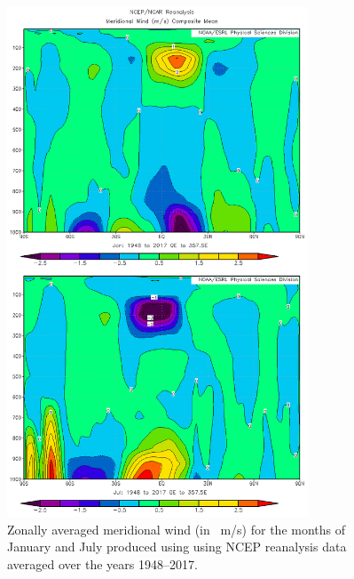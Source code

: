 \documentclass[11pt]{article}
\begin{document}
\begin{figure}[h!]
  \centering
  \includegraphics[width=0.8\textwidth]{mer_wind_janjul.png}
  \caption{Zonally averaged meridional wind (in \SI{}{\m/\s}) for the months of January and July produced using using NCEP reanalysis data averaged over the years 1948--2017.}
  \label{fig:mer_wind}
\end{figure}
\end{document}
